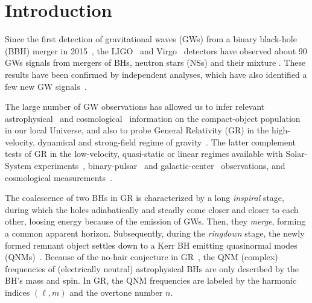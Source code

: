 \documentclass[twocolumn,
               prd,
               aps,
               superscriptaddress,
               tightenlines,
               nofootinbib,
               eqsecnum,
               amsfonts,
               amsmath,
               longbibliography]{revtex4-1}
\begin{document}
\section{Introduction}
\label{sec:intro}

Since the first detection of gravitational waves (GWs) from a binary black-hole (BBH) merger in 2015~\cite{LIGOScientific:2016aoc},
the LIGO~\cite{LIGOScientific:2014pky} and Virgo~\cite{VIRGO:2014yos} detectors have observed about 90 GWs signals \cite{LIGOScientific:2021djp} from mergers
of BHs, neutron stars (NSs) \cite{TheLIGOScientific:2017qsa,LIGOScientific:2018cki,LIGOScientific:2020aai} and their mixture \cite{LIGOScientific:2021qlt}. These results have been confirmed
by independent analyses, which have also identified a few new GW signals~\cite{Nitz:2018imz,Nitz:2019hdf,Venumadhav:2019lyq,Zackay:2019btq,Nitz:2021zwj,Olsen:2022pin}.

The large number of GW observations has allowed us to infer relevant astrophysical~\cite{LIGOScientific:2021aug} and cosmological~\cite{LIGOScientific:2021psn} information on the compact-object population in our local Universe, and also to probe General Relativity (GR) in the high-velocity, dynamical and strong-field regime of gravity~\cite{LIGOScientific:2021sio}. The latter complement tests of GR in the low-velocity, quasi-static or linear regimes available with Solar-System experiments~\cite{Will:2014kxa}, binary-pulsar~\cite{Wex:2014nva,Kramer:2021jcw} and galactic-center~\cite{GRAVITY:2018ofz,Do:2019txf,EventHorizonTelescope:2019ths} observations,
and cosmological measurements~\cite{Clifton:2011jh}.

The coalescence of two BHs in GR is characterized by a long \textit{inspiral} stage, during which the
holes adiabatically and steadly come closer and closer to each other, loosing energy because of the emission
of GWs. Then, they \textit{merge}, forming a common apparent horizon. Subsequently, during the \textit{ringdown} stage, the newly formed remnant object settles down to a Kerr BH emitting quasinormal modes (QNMs)~\cite{Vishveshwara:1970cc,Press:1971wr,Chandrasekhar:1975zza}. Because of the no-hair conjecture in GR~\cite{Carter:1971zc,Israel:1967wq,Hawking:1971vc,Robinson:1975bv}, the QNM (complex) frequencies of (electrically neutral) astrophysical BHs are only described by the BH's mass and spin. In GR, the QNM frequencies are labeled by the harmonic indices $(\ell,m)$ and the overtone number $n$.
\end{document}
